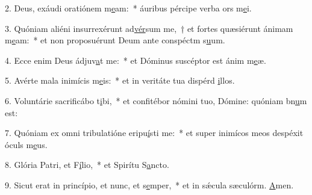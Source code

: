 2. Deus, exáudi oratiónem m\uline{e}am:~* áuribus pércipe verba ors m\uline{e}i.\par 
3. Quóniam aliéni insurrexérunt ad\uline{vér}sum me,~† et fortes quæsiérunt ánimam m\uline{e}am:~* et non proposuérunt Deum ante conspéctm s\uline{u}um.\par 
4. Ecce enim Deus ádjuv\uline{a}t me:~* et Dóminus suscéptor est ánim m\uline{e}æ.\par 
5. Avérte mala inimícis m\uline{e}is:~* et in veritáte tua dispérd \uline{i}llos.\par 
6. Voluntárie sacrificábo t\uline{i}bi,~* et confitébor nómini tuo, Dómine: quóniam bn\uline{u}m est:\par 
7. Quóniam ex omni tribulatióne eripu\uline{í}sti me:~* et super inimícos meos despéxit óculs m\uline{e}us.\par 
8. Glória Patri, et F\uline{í}lio,~* et Spirítu S\uline{a}ncto.\par 
9. Sicut erat in princípio, et nunc, et s\uline{e}mper,~* et in sǽcula sæculórm. \uline{A}men.\par 
